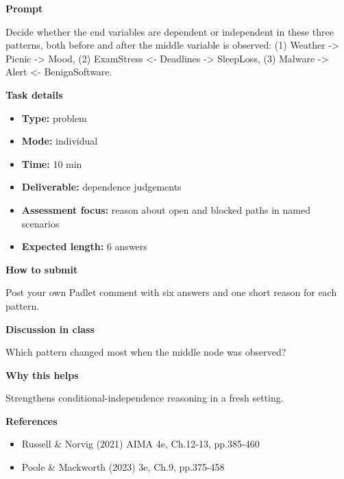 \documentclass[11pt]{article}
\begin{document}
\begin{tcolorbox}[colback=white,colframe=MidnightBlue,title={Q2 Dependence Reasoning},fonttitle=\bfseries,breakable]
\begin{center}
\end{center}

{\large\bfseries\color{MidnightBlue} Prompt}\par\medskip
Decide whether the end variables are dependent or independent in these three patterns, both before and after the middle variable is observed: (1) Weather -\textgreater{} Picnic -\textgreater{} Mood, (2) ExamStress \textless- Deadlines -\textgreater{} SleepLoss, (3) Malware -\textgreater{} Alert \textless- BenignSoftware.

{\large\bfseries\color{MidnightBlue} Task details}\par\medskip
\begin{itemize}\item \textbf{Type:} problem
\item \textbf{Mode:} individual
\item \textbf{Time:} 10 min
\item \textbf{Deliverable:} dependence judgements
\item \textbf{Assessment focus:} reason about open and blocked paths in named scenarios
\item \textbf{Expected length:} 6 answers\end{itemize}

{\large\bfseries\color{MidnightBlue} How to submit}\par\medskip
Post your own Padlet comment with six answers and one short reason for each pattern.

{\large\bfseries\color{MidnightBlue} Discussion in class}\par\medskip
Which pattern changed most when the middle node was observed?

{\large\bfseries\color{MidnightBlue} Why this helps}\par\medskip
Strengthens conditional-independence reasoning in a fresh setting.

{\large\bfseries\color{MidnightBlue} References}\par\medskip
\begin{itemize}\item Russell \& Norvig (2021) AIMA 4e, Ch.12-13, pp.385-460
\item Poole \& Mackworth (2023) 3e, Ch.9, pp.375-458\end{itemize}
\end{tcolorbox}
\end{document}
